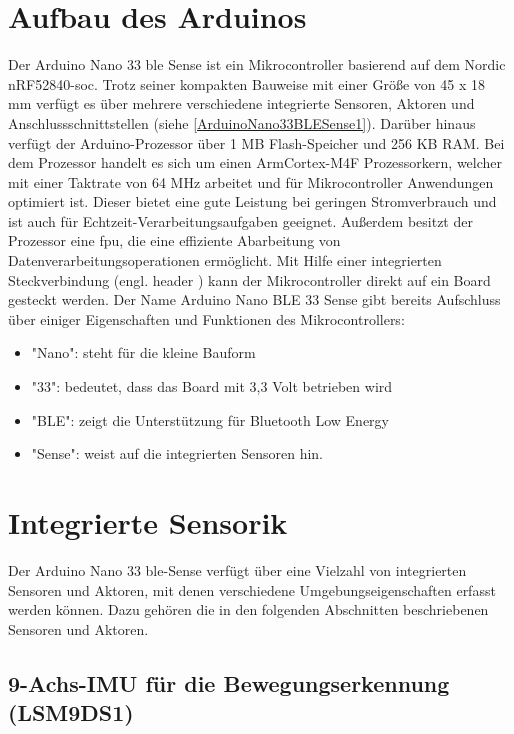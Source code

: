 \section{Aufbau des Arduinos}

Der Arduino Nano 33 \ac{ble} Sense ist ein Mikrocontroller basierend auf dem Nordic nRF52840-\ac{soc}. Trotz seiner kompakten Bauweise mit einer Größe von 45 x 18 mm verfügt es über mehrere verschiedene integrierte Sensoren, Aktoren und Anschlussschnittstellen (siehe \autoref{ArduinoNano33BLESense1}). Darüber hinaus verfügt der Arduino-Prozessor über 1 MB Flash-Speicher und 256 KB RAM. Bei dem Prozessor handelt es sich um einen Arm\textregistered Cortex-M4F Prozessorkern, welcher mit einer Taktrate von 64 MHz arbeitet und für Mikrocontroller Anwendungen optimiert ist. Dieser bietet eine gute Leistung bei geringen Stromverbrauch und ist auch für Echtzeit-Verarbeitungsaufgaben geeignet. Außerdem besitzt der Prozessor eine \ac{fpu}, die eine effiziente Abarbeitung von Datenverarbeitungsoperationen ermöglicht. Mit Hilfe einer integrierten Steckverbindung (engl. \glqq header \grqq) kann der Mikrocontroller direkt auf ein Board gesteckt werden. Der Name Arduino Nano BLE 33 Sense gibt bereits Aufschluss über einiger Eigenschaften und Funktionen des Mikrocontrollers:
\begin{itemize}
	\item "Nano": steht für die kleine Bauform
	\item "33": bedeutet, dass das Board mit 3,3 Volt betrieben wird
	\item "BLE": zeigt die Unterstützung für Bluetooth Low Energy
	\item "Sense": weist auf die integrierten Sensoren hin.
\end{itemize}
 \cite{Arm.2020} \cite{Ard.2024}

\section{Integrierte Sensorik}

Der Arduino Nano 33 \ac{ble}-Sense verfügt über eine Vielzahl von integrierten Sensoren und Aktoren, mit denen verschiedene Umgebungseigenschaften erfasst werden können. Dazu gehören die in den folgenden Abschnitten beschriebenen Sensoren und Aktoren.

\subsection{9-Achs-IMU für die Bewegungserkennung (LSM9DS1)}\label{9Achs}

